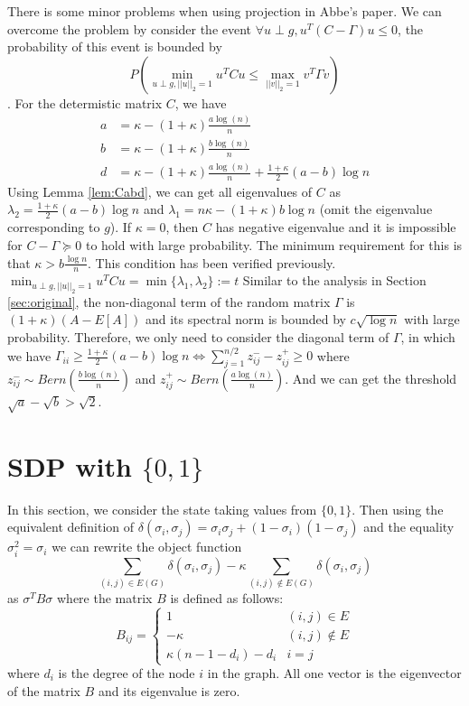 \documentclass{ctexart}
\newcommand{\A}{\frac{a \log(n)}{n}}
\newcommand{\B}{\frac{b \log(n)}{n}}
\begin{document}
There is some minor problems when using projection in Abbe's paper. We can overcome the problem by consider
the event $\forall u \perp g, u^T(C-\Gamma)u \leq 0$, the probability of this event is bounded by
$$P(\min_{u \perp g, ||u||_2=1} u^T C u \leq \max_{||v||_2=1} v^T \Gamma v)$$.
For the determistic matrix $C$, we have
\begin{align}
a &= \kappa - (1+\kappa) \A \\
b &= \kappa - (1+\kappa) \B \\
d & = \kappa - (1+\kappa) \A + \frac{1+\kappa}{2} (a-b) \log n
\end{align}
Using Lemma \ref{lem:Cabd}, we can get all eigenvalues of $C$ as $\lambda_2=\frac{1+\kappa}{2}(a-b)\log n $ and $\lambda_1=n\kappa - (1+\kappa)b\log n$
(omit the eigenvalue corresponding to $g$). If $\kappa = 0$, then $C$ has negative eigenvalue and it is impossible for
$C-\Gamma \succeq 0 $ to hold
with large probability. The minimum requirement for this is that $\kappa > b\frac{\log n}{n}$.
This condition has been verified previously.
$\min_{u \perp g, ||u||_2=1} u^T C u = \min\{\lambda_1, \lambda_2\} := t$
Similar to the analysis in Section \ref{sec:original}, the non-diagonal term of the random matrix $\Gamma$ is $(1+\kappa)(A-E[A])$ and its
spectral norm is bounded by $c\sqrt{\log n}$ with large probability.
Therefore, we only need to consider the diagonal term of $\Gamma$, in which we have
$\Gamma_{ii} \geq \frac{1+\kappa}{2}(a-b)\log n \iff \sum_{j=1}^{n/2} z^-_{ij} - z^+_{ij} \geq 0$
where $z^-_{ij} \sim Bern(\B)$ and $z^+_{ij} \sim Bern(\A)$.
And we can get the threshold $\sqrt{a} - \sqrt{b} > \sqrt{2}$.

\section{SDP with $\{0,1\}$}
In this section, we consider the state taking values from $\{0,1\}$. Then using
the equivalent definition of $\delta(\sigma_i, \sigma_j) = \sigma_i \sigma_j + (1-\sigma_i)(1-\sigma_j)$ and
the equality $\sigma_i^2 =\sigma_i$
we can rewrite the object function
\begin{equation}
\sum_{(i,j)\in E(G)} \delta(\sigma_i, \sigma_j) -
\kappa \sum_{(i,j) \not\in E(G)} \delta(\sigma_i, \sigma_j)
\end{equation}
as $\sigma^T B \sigma$ where the matrix $B$ is defined as follows:
\begin{equation}
B_{ij} = \begin{cases}
1 & (i,j) \in E \\
-\kappa & (i,j) \not\in E\\
\kappa (n-1 - d_i) - d_i & i=j
\end{cases}
\end{equation}
where $d_i$ is the degree of the node $i$ in the graph.
All one vector is the eigenvector of the  matrix $B$ and its eigenvalue is zero.
\end{document}
